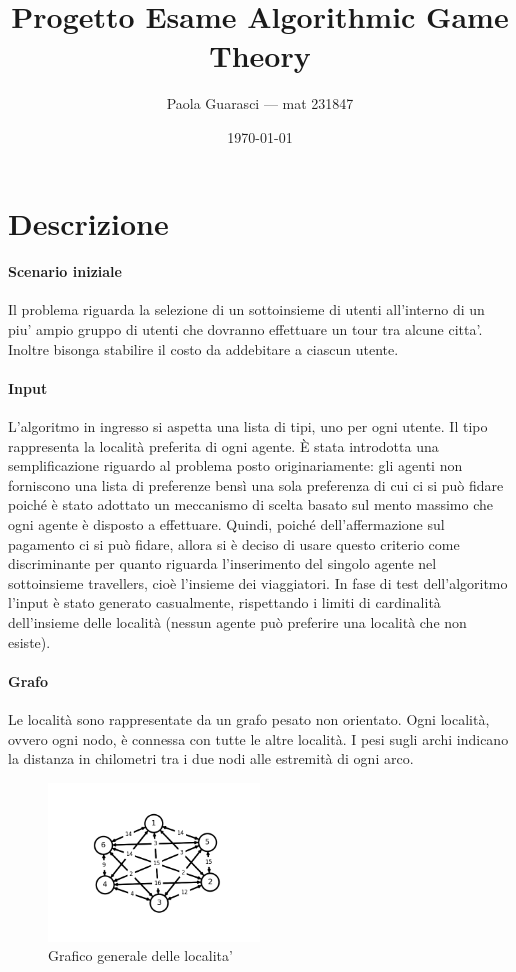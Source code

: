 \documentclass{article}
\title{Progetto Esame Algorithmic Game Theory}
\author{Paola Guarasci --- mat 231847}
\date{\today}
\begin{document}
\maketitle

\section*{Descrizione}
\paragraph*{Scenario iniziale}
Il problema riguarda la selezione di un sottoinsieme di utenti all'interno di un piu' ampio gruppo di utenti che dovranno effettuare un tour tra alcune citta'. Inoltre bisonga stabilire il costo da addebitare a ciascun utente. 
\paragraph*{Input}
L'algoritmo in ingresso si aspetta una lista di tipi, uno per ogni utente. Il tipo rappresenta la località preferita di ogni agente. È stata introdotta una semplificazione riguardo al problema posto originariamente: gli agenti non forniscono una lista di preferenze bensì una sola preferenza di cui ci si può fidare poiché è stato adottato un meccanismo di scelta basato sul mento massimo che ogni agente è disposto a effettuare. Quindi, poiché dell'affermazione sul pagamento ci si può fidare, allora si è deciso di usare questo criterio come discriminante per quanto riguarda l'inserimento del singolo agente nel sottoinsieme travellers, cioè l'insieme dei viaggiatori.
In fase di test dell'algoritmo l'input è stato generato casualmente, rispettando i limiti di cardinalità dell'insieme delle località (nessun agente può preferire una località che non esiste).

\paragraph*{Grafo}
Le località sono rappresentate da un grafo pesato non orientato. Ogni località, ovvero ogni nodo, è connessa con tutte le altre località. I pesi sugli archi indicano la distanza in chilometri tra i due nodi alle estremità di ogni arco.

\begin{figure}[h]
  \centering
  \includegraphics[width=0.50\textwidth]{img/graphTot.png}
  \caption{Grafico generale delle localita'}\label{fig:graphTot.png}
\end{figure}
\end{document}
